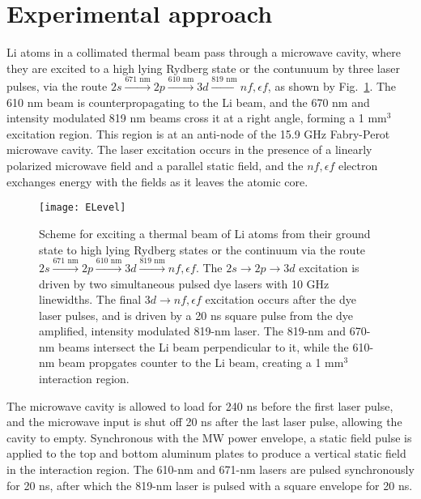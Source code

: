 \documentclass[aps,pra,preprint,groupedaddress]{revtex4-1}
\begin{document}
\section{\label{sec:exp} Experimental approach}


Li atoms in a collimated thermal beam pass through a microwave cavity, where they are excited to a high lying Rydberg state or the contunuum by three laser pulses, via the route $2s \xrightarrow{\text{671 nm}} 2p \xrightarrow{\text{610 nm}} 3d \xrightarrow{\text{819 nm}} nf, \epsilon f$, as shown by Fig.~\ref{fig:ELev}. The 610 nm beam is counterpropagating to the Li beam, and the 670 nm and intensity modulated 819 nm beams cross it at a right angle, forming a 1 mm$^3$ excitation region. This region is at an anti-node of the 15.9 GHz Fabry-Perot microwave cavity. The laser excitation occurs in the presence of a linearly polarized microwave field and a parallel static field, and the $nf, \epsilon f$ electron exchanges energy with the fields as it leaves the atomic core.

\begin{figure}
	\texttt{[image: ELevel]}
	\caption{Scheme for exciting a thermal beam of Li atoms from their ground state to high lying Rydberg states or the continuum via the route $2s \xrightarrow{\text{671 nm}} 2p \xrightarrow{\text{610 nm}} 3d \xrightarrow{\text{819 nm}} nf, \epsilon f$. The $2s \rightarrow 2p \rightarrow 3d$ excitation is driven by two simultaneous pulsed dye lasers with 10 GHz linewidths. The final $3d \rightarrow nf, \epsilon f$ excitation occurs after the dye laser pulses, and is driven by a 20 ns square pulse from the dye amplified, intensity modulated 819-nm laser. The 819-nm and 670-nm beams intersect the Li beam perpendicular to it, while the 610-nm beam propgates counter to the Li beam, creating a 1 mm$^3$ interaction region.}
	\label{fig:ELev}
\end{figure}



The microwave cavity is allowed to load for 240 ns before the first laser pulse, and the microwave input is shut off 20 ns after the last laser pulse, allowing the cavity to empty. Synchronous with the MW power envelope, a static field pulse is applied to the top and bottom aluminum plates to produce a vertical static field in the interaction region. The 610-nm and 671-nm lasers are pulsed synchronously for 20 ns, after which the 819-nm laser is pulsed with a square envelope for 20 ns.
\end{document}
